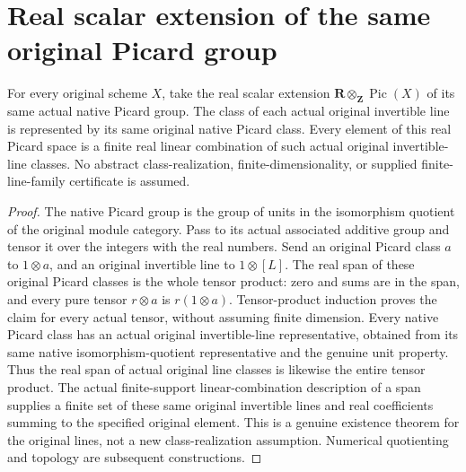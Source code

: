 \section{Real scalar extension of the same original Picard group}
\label{sec:native-real-picard}

\begin{theorem}
\label{thm:native-real-picard}
\leanok
{}
For every original scheme $X$, take the real scalar extension
$\mathbf R\otimes_{\mathbf Z}\operatorname{Pic}(X)$ of its
same actual native Picard group. The class of each actual original
invertible line is represented by its same original native Picard
class. Every element of this real Picard space is a finite real
linear combination of such actual original invertible-line classes.
No abstract class-realization, finite-dimensionality, or supplied
finite-line-family certificate is assumed.
\end{theorem}

\begin{proof}
The native Picard group is the group of units in the isomorphism
quotient of the original module category. Pass to its actual
associated additive group and tensor it over the integers with
the real numbers. Send an original Picard class $a$ to $1\otimes a$,
and an original invertible line to $1\otimes[L]$. The real span
of these original Picard classes is the whole tensor product:
zero and sums are in the span, and every pure tensor $r\otimes a$
is $r(1\otimes a)$. Tensor-product induction proves the claim
for every actual tensor, without assuming finite dimension.
Every native Picard class has an actual original invertible-line
representative, obtained from its same native isomorphism-quotient
representative and the genuine unit property. Thus the real span
of actual original line classes is likewise the entire tensor
product. The actual finite-support linear-combination description
of a span supplies a finite set of these same original invertible
lines and real coefficients summing to the specified original
element. This is a genuine existence theorem for the original
lines, not a new class-realization assumption. Numerical
quotienting and topology are subsequent constructions.
\end{proof}
